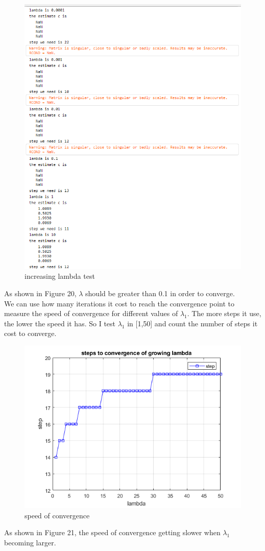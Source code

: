 \documentclass[a4paper]{article}
\begin{document}
\begin{figure}[H] 
\centering 
\includegraphics[width=1.0\textwidth]{2.3-2.png}
\caption{increasing lambda test} 
\label{Fig.2.3-2} 
\end{figure}

As shown in Figure 20, $\lambda$ should be greater than 0.1 in order to converge.\\
\indent We can use how many iterations it cost to reach the convergence point to measure the speed of convergence for different values of $\lambda_{1}$. The more steps it use, the lower the speed it has. So I test $\lambda_{1}$ in [1,50] and count the number of steps it cost to converge.

\begin{figure}[H] 
\centering 
\includegraphics[width=1.0\textwidth]{2.3-3.png}
\caption{speed of convergence} 
\label{Fig.2.3-3} 
\end{figure}

As shown in Figure 21, the speed of convergence getting slower when $\lambda_{1}$ becoming larger.
\end{document}
